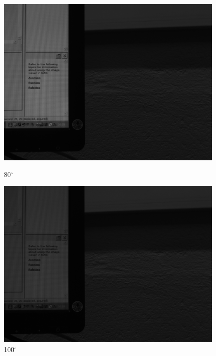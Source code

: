 \documentclass{article}
\begin{document}
\begin{figure}[H]
\begin{minipage}[b]{0.16\linewidth}
\includegraphics[width=1.0\textwidth,natwidth=100,natheight=100]{../LMS/im80.png}
  \caption{80$^\circ$}
  \label{fig:lms11-5}
\end{minipage}
\quad
\begin{minipage}[b]{0.16\linewidth}
\includegraphics[width=1.0\textwidth,natwidth=100,natheight=100]{../LMS/im100.png}
  \caption{100$^\circ$}
  \label{fig:lms11-6}
\end{minipage}
\quad
\begin{minipage}[b]{0.16\linewidth}

\end{minipage}
\end{figure}
\end{document}
